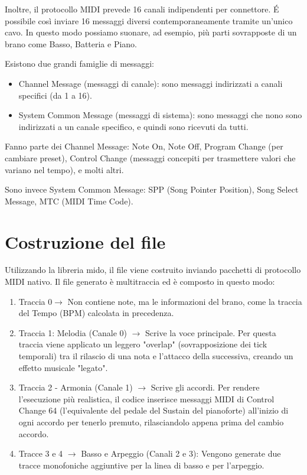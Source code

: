 Inoltre, il protocollo MIDI prevede 16 canali indipendenti per connettore. É possibile così inviare 16 messaggi diversi contemporaneamente tramite un’unico cavo. In questo modo possiamo suonare, ad esempio, più parti sovrapposte di un brano come Basso, Batteria e Piano.

Esistono due grandi famiglie di messaggi:

\begin{itemize}
    \item Channel Message (messaggi di canale): sono messaggi indirizzati a canali specifici (da 1 a 16).
    \item System Common Message (messaggi di sistema): sono messaggi che nono sono indirizzati a un canale specifico, e quindi sono ricevuti da tutti.

\end{itemize}
Fanno parte dei Channel Message: Note On, Note Off, Program Change (per cambiare preset), Control Change (messaggi concepiti per trasmettere valori che variano nel tempo), e molti altri.

Sono invece System Common Message: SPP (Song Pointer Position), Song Select Message, MTC (MIDI Time Code).


\section{Costruzione del file}


Utilizzando la libreria mido, il file viene costruito inviando pacchetti di protocollo MIDI nativo. Il file generato è multitraccia ed è composto in questo modo:
\begin{enumerate}
    \item Traccia 0$\rightarrow$ Non contiene note, ma le informazioni del brano, come la traccia del Tempo (BPM) calcolata in precedenza.
    \item Traccia 1: Melodia (Canale 0) $\rightarrow$ Scrive la voce principale. Per questa traccia viene applicato un leggero "overlap" (sovrapposizione dei tick temporali) tra il rilascio di una nota e l'attacco della successiva, creando un effetto musicale "legato".
    \item Traccia 2 - Armonia (Canale 1) $\rightarrow$ Scrive gli accordi. Per rendere l'esecuzione più realistica, il codice inserisce messaggi MIDI di Control Change 64 (l'equivalente del pedale del Sustain del pianoforte) all'inizio di ogni accordo per tenerlo premuto, rilasciandolo appena prima del cambio accordo.
    \item Tracce 3 e 4 $\rightarrow$  Basso e Arpeggio (Canali 2 e 3): Vengono generate due tracce monofoniche aggiuntive per la linea di basso e per l'arpeggio.
\end{enumerate}

